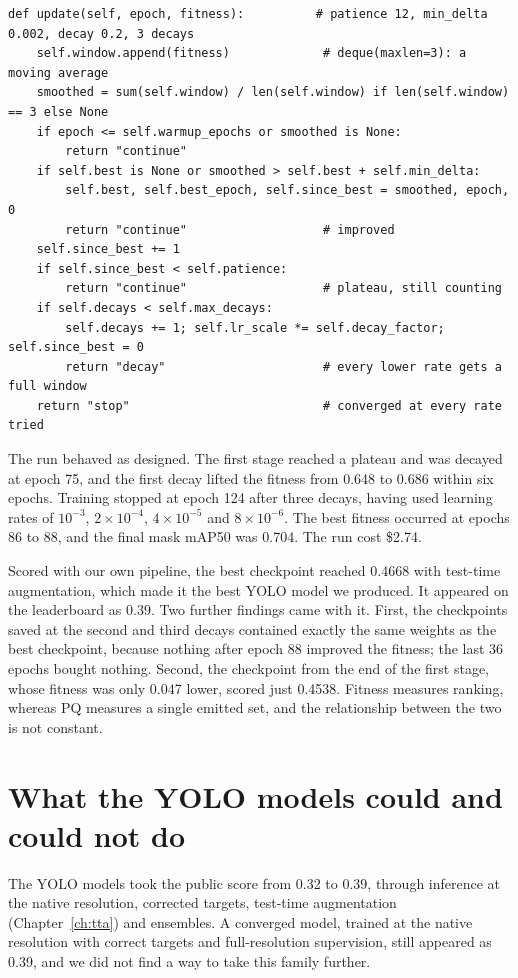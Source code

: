 \begin{lstlisting}[caption={Decay on plateau, stop at convergence. Condensed from
\file{experiments/exp\_097\_runpod\_yolo/src/convergence.py}.},label=lst:yolo-plateau]
def update(self, epoch, fitness):          # patience 12, min_delta 0.002, decay 0.2, 3 decays
    self.window.append(fitness)             # deque(maxlen=3): a moving average
    smoothed = sum(self.window) / len(self.window) if len(self.window) == 3 else None
    if epoch <= self.warmup_epochs or smoothed is None:
        return "continue"
    if self.best is None or smoothed > self.best + self.min_delta:
        self.best, self.best_epoch, self.since_best = smoothed, epoch, 0
        return "continue"                   # improved
    self.since_best += 1
    if self.since_best < self.patience:
        return "continue"                   # plateau, still counting
    if self.decays < self.max_decays:
        self.decays += 1; self.lr_scale *= self.decay_factor; self.since_best = 0
        return "decay"                      # every lower rate gets a full window
    return "stop"                           # converged at every rate tried
\end{lstlisting}

The run behaved as designed. The first stage reached a plateau and was decayed at epoch 75, and the
first decay lifted the fitness from 0.648 to 0.686 within six epochs. Training stopped at epoch 124
after three decays, having used learning rates of $10^{-3}$, $2\times10^{-4}$, $4\times10^{-5}$ and
$8\times10^{-6}$. The best fitness occurred at epochs 86 to 88, and the final mask mAP50 was 0.704.
The run cost \$2.74.

Scored with our own pipeline, the best checkpoint reached 0.4668 with test-time augmentation, which
made it the best YOLO model we produced. It appeared on the leaderboard as 0.39. Two further findings
came with it. First, the checkpoints saved at the second and third decays contained exactly the same
weights as the best checkpoint, because nothing after epoch 88 improved the fitness; the last 36
epochs bought nothing. Second, the checkpoint from the end of the first stage, whose fitness was
only 0.047 lower, scored just 0.4538. Fitness measures ranking, whereas PQ measures a single emitted
set, and the relationship between the two is not constant.

\section{What the YOLO models could and could not do}\label{sec:yolo-lessons}
The YOLO models took the public score from 0.32 to 0.39, through inference at the native resolution,
corrected targets, test-time augmentation (Chapter~\ref{ch:tta}) and ensembles. A converged model,
trained at the native resolution with correct targets and full-resolution supervision, still
appeared as 0.39, and we did not find a way to take this family further.

